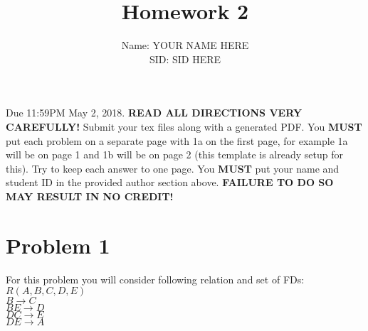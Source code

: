 \documentclass{article}
\begin{document}
\title{Homework 2}
\author{Name: YOUR NAME HERE\\SID: SID HERE}

\maketitle

Due 11:59PM May 2, 2018. {\bf READ ALL DIRECTIONS VERY CAREFULLY!} 
Submit your tex files along with a generated PDF.
You {\bf MUST} put each problem on a separate page with 1a on the first page, for example 1a will be on page 1 and 1b will be on page 2 (this template is already setup for this). Try to keep each answer to one page. 
You {\bf MUST} put your name and student ID in the provided author section above. {\bf FAILURE TO DO SO MAY RESULT IN NO CREDIT!} 


\section*{Problem 1}
For this problem you will consider following relation and set of FDs:\\
$R(A,B,C,D,E)$\\
$B\rightarrow C$\\
$BE\rightarrow D$\\
$DC\rightarrow E$\\
$DE\rightarrow A$\\
\end{document}
